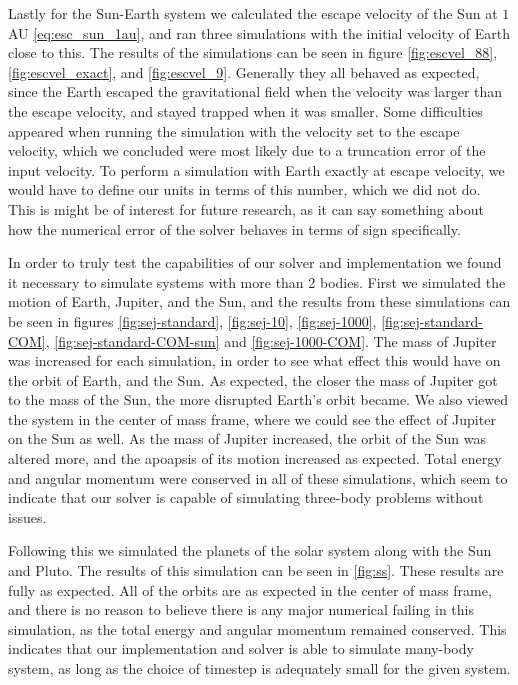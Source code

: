 \documentclass[reprint,english,notitlepage]{revtex4-1}  %
\begin{document}
Lastly for the Sun-Earth system we calculated the escape velocity of the Sun at \(1\) AU \eqref{eq:esc_sun_1au}, and ran three simulations with the initial velocity of Earth close to this. The results of the simulations can be seen in figure \ref{fig:escvel_88}, \ref{fig:escvel_exact}, and \ref{fig:escvel_9}. Generally they all behaved as expected, since the Earth escaped the gravitational field when the velocity was larger than the escape velocity, and stayed trapped when it was smaller. Some difficulties appeared when running the simulation with the velocity set to the escape velocity, which we concluded were most likely due to a truncation error of the input velocity. To perform a simulation with Earth exactly at escape velocity, we would have to define our units in terms of this number, which we did not do. This is might be of interest for future research, as it can say something about how the numerical error of the solver behaves in terms of sign specifically.

In order to truly test the capabilities of our solver and implementation we found it necessary to simulate systems with more than 2 bodies. First we simulated the motion of Earth, Jupiter, and the Sun, and the results from these simulations can be seen in figures \ref{fig:sej-standard}, \ref{fig:sej-10}, \ref{fig:sej-1000}, \ref{fig:sej-standard-COM}, \ref{fig:sej-standard-COM-sun} and \ref{fig:sej-1000-COM}. The mass of Jupiter was increased for each simulation, in order to see what effect this would have on the orbit of Earth, and the Sun. As expected, the closer the mass of Jupiter got to the mass of the Sun, the more disrupted Earth's orbit became. We also viewed the system in the center of mass frame, where we could see the effect of Jupiter on the Sun as well. As the mass of Jupiter increased, the orbit of the Sun was altered more, and the apoapsis of its motion increased as expected. Total energy and angular momentum were conserved in all of these simulations, which seem to indicate that our solver is capable of simulating three-body problems without issues.

Following this we simulated the planets of the solar system along with the Sun and Pluto. The results of this simulation can be seen in \ref{fig:ss}. These results are fully as expected. All of the orbits are as expected in the center of mass frame, and there is no reason to believe there is any major numerical failing in this simulation, as the total energy and angular momentum remained conserved. This indicates that our implementation and solver is able to simulate many-body system, as long as the choice of timestep is adequately small for the given system.
\end{document}
